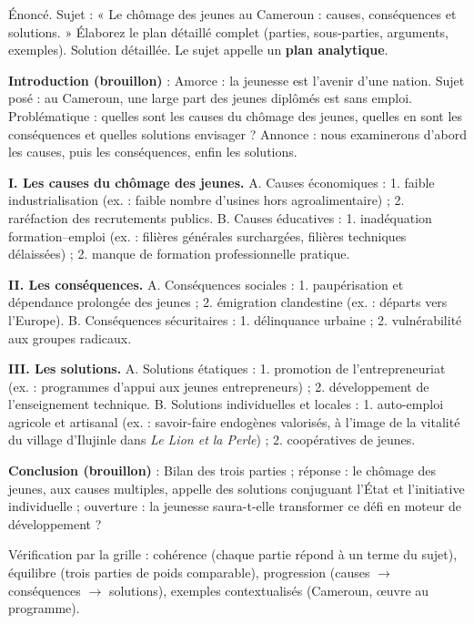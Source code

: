 \documentclass[11pt]{article}
\begin{document}
\begin{exoresolu}
Énoncé. Sujet : « Le chômage des jeunes au Cameroun : causes, conséquences et solutions. » Élaborez le plan détaillé complet (parties, sous-parties, arguments, exemples).
\tcblower
Solution détaillée. Le sujet appelle un \textbf{plan analytique}.

\textbf{Introduction (brouillon)} : Amorce : la jeunesse est l'avenir d'une nation. Sujet posé : au Cameroun, une large part des jeunes diplômés est sans emploi. Problématique : quelles sont les causes du chômage des jeunes, quelles en sont les conséquences et quelles solutions envisager ? Annonce : nous examinerons d'abord les causes, puis les conséquences, enfin les solutions.

\textbf{I. Les causes du chômage des jeunes.}
A. Causes économiques : 1. faible industrialisation (ex. : faible nombre d'usines hors agroalimentaire) ; 2. raréfaction des recrutements publics.
B. Causes éducatives : 1. inadéquation formation--emploi (ex. : filières générales surchargées, filières techniques délaissées) ; 2. manque de formation professionnelle pratique.

\textbf{II. Les conséquences.}
A. Conséquences sociales : 1. paupérisation et dépendance prolongée des jeunes ; 2. émigration clandestine (ex. : départs vers l'Europe).
B. Conséquences sécuritaires : 1. délinquance urbaine ; 2. vulnérabilité aux groupes radicaux.

\textbf{III. Les solutions.}
A. Solutions étatiques : 1. promotion de l'entrepreneuriat (ex. : programmes d'appui aux jeunes entrepreneurs) ; 2. développement de l'enseignement technique.
B. Solutions individuelles et locales : 1. auto-emploi agricole et artisanal (ex. : savoir-faire endogènes valorisés, à l'image de la vitalité du village d'Ilujinle dans \emph{Le Lion et la Perle}) ; 2. coopératives de jeunes.

\textbf{Conclusion (brouillon)} : Bilan des trois parties ; réponse : le chômage des jeunes, aux causes multiples, appelle des solutions conjuguant l'État et l'initiative individuelle ; ouverture : la jeunesse saura-t-elle transformer ce défi en moteur de développement ?

Vérification par la grille : cohérence (chaque partie répond à un terme du sujet), équilibre (trois parties de poids comparable), progression (causes $\rightarrow$ conséquences $\rightarrow$ solutions), exemples contextualisés (Cameroun, œuvre au programme).
\end{exoresolu}
\end{document}
